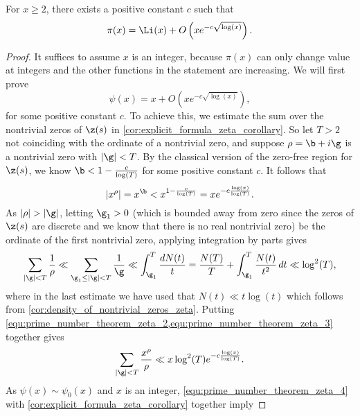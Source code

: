       \begin{theorem}
        For $x \ge 2$, there exists a positive constant $c$ such that
        \[
          \pi(x) = \Li(x)+O\left(xe^{-c\sqrt{\log(x)}}\right).
        \]
      \end{theorem}
      \begin{proof}
        It suffices to assume $x$ is an integer, because $\pi(x)$ can only change value at integers and the other functions in the statement are increasing. We will first prove
        \begin{equation}\label{equ:prime_number_theorem_zeta_1}
          \psi(x) = x+O\left(xe^{-c\sqrt{\log(x)}}\right),
        \end{equation}
        for some positive constant $c$. To achieve this, we estimate the sum over the nontrivial zeros of $\z(s)$ in \cref{cor:explicit_formula_zeta_corollary}. So let $T > 2$ not coinciding with the ordinate of a nontrivial zero, and suppose $\rho = \b+i\g$ is a nontrivial zero with $|\g| < T$. By the classical version of the zero-free region for $\z(s)$, we know $\b < 1-\frac{c}{\log(T)}$ for some positive constant $c$. It follows that
        \begin{equation}\label{equ:prime_number_theorem_zeta_2}
          |x^{\rho}| = x^{\b} < x^{1-\frac{c}{\log(T)}} = xe^{-c\frac{\log(x)}{\log(T)}}.
        \end{equation}
        As $|\rho| > |\g|$, letting $\g_{1} > 0$ (which is bounded away from zero since the zeros of $\z(s)$ are discrete and we know that there is no real nontrivial zero) be the ordinate of the first nontrivial zero, applying integration by parts gives
        \begin{equation}\label{equ:prime_number_theorem_zeta_3}
          \sum_{|\g| < T}\frac{1}{\rho} \ll \sum_{\g_{1} \le |\g| < T}\frac{1}{\g} \ll \int_{\g_{1}}^{T}\frac{dN(t)}{t} = \frac{N(T)}{T}+\int_{\g_{1}}^{T}\frac{N(t)}{t^{2}}\,dt \ll \log^{2}(T),
        \end{equation}
        where in the last estimate we have used that $N(t) \ll t\log(t)$ which follows from \cref{cor:density_of_nontrivial_zeros_zeta}. Putting \cref{equ:prime_number_theorem_zeta_2,equ:prime_number_theorem_zeta_3} together gives
        \begin{equation}\label{equ:prime_number_theorem_zeta_4}
          \sum_{|\g| < T}\frac{x^{\rho}}{\rho} \ll x\log^{2}(T)e^{-c\frac{\log(x)}{\log(T)}}.
        \end{equation}
        As $\psi(x) \sim \psi_{0}(x)$ and $x$ is an integer, \cref{equ:prime_number_theorem_zeta_4} with \cref{cor:explicit_formula_zeta_corollary} together imply

\end{proof}
